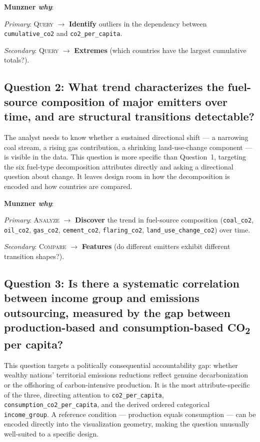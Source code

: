 \documentclass[10pt]{article}
\begin{document}
\textbf{Munzner \emph{why}}: 

\textit{Primary}: \textsc{Query} $\rightarrow$ \textbf{Identify} outliers in the dependency between \texttt{cumulative\_co2} and \texttt{co2\_per\_capita}.


\textit{Secondary}: \textsc{Query} $\rightarrow$ \textbf{Extremes} (which countries have the largest cumulative totals?).

\subsection{Question 2: What trend characterizes the fuel-source composition of major emitters over time, and are structural transitions detectable?}

The analyst needs to know whether a sustained directional shift --- a narrowing coal stream, a rising gas contribution, a shrinking land-use-change component --- is visible in the data. This question is more specific than Question~1, targeting the six fuel-type decomposition attributes directly and asking a directional question about change. It leaves design room in how the decomposition is encoded and how countries are compared.

\textbf{Munzner \emph{why}}: 

\textit{Primary}: \textsc{Analyze} $\rightarrow$ \textbf{Discover} the trend in fuel-source composition (\texttt{coal\_co2}, \texttt{oil\_co2}, \texttt{gas\_co2}, \texttt{cement\_co2}, \texttt{flaring\_co2}, \texttt{land\_use\_change\_co2}) over time.

\textit{Secondary}: \textsc{Compare} $\rightarrow$ \textbf{Features} (do different emitters exhibit different transition shapes?).

\subsection{Question 3: Is there a systematic correlation between income group and emissions outsourcing, measured by the gap between production-based and consumption-based CO\textsubscript{2} per capita?}

This question targets a politically consequential accountability gap: whether wealthy nations' territorial emissions reductions reflect genuine decarbonization or the offshoring of carbon-intensive production. It is the most attribute-specific of the three, directing attention to \texttt{co2\_per\_capita}, \texttt{consumption\_co2\_per\_capita}, and the derived ordered categorical \texttt{income\_group}. A reference condition --- production equals consumption --- can be encoded directly into the visualization geometry, making the question unusually well-suited to a specific design.
\end{document}
